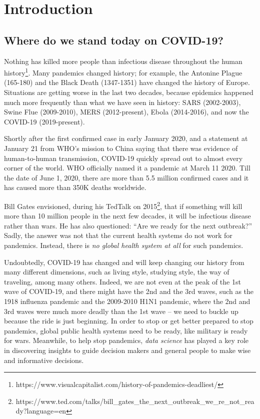 \section{Introduction}
\label{sec:intro}

\subsection{Where do we stand today on COVID-19?}

Nothing has killed more people than infectious disease throughout the human history\footnote{https://www.visualcapitalist.com/history-of-pandemics-deadliest/}. Many pandemics changed history; for example, the Antonine Plague (165-180) and the Black Death (1347-1351) have changed the history of Europe.
%
Situations are getting worse in the last two decades, because epidemics happened much more frequently than what we have seen in history: SARS (2002-2003), Swine Flue (2009-2010), MERS (2012-present), Ebola (2014-2016), and now the COVID-19 (2019-present).


Shortly after the first confirmed case in early January 2020, and a statement at January 21 from WHO's mission to China saying that there was evidence of human-to-human transmission, COVID-19 quickly spread out to almost every corner of the world. WHO officially named it a pandemic at March 11 2020. Till the date of June 1, 2020, there are more than 5.5 million confirmed cases and it has caused more than 350K deaths worldwide.

Bill Gates envisioned, during his TedTalk on 2015\footnote{https://www.ted.com/talks/bill\_gates\_the\_next\_outbreak\_we\_re\_not\_ready?language=en}, that if something will kill more than 10 million people in the next few decades, it will be infectious disease rather than wars.
He has also questioned: ``Are we ready for the next outbreak?'' 
Sadly, the answer was not that the current health systems do not work for pandemics. 
Instead, there is {\em no global health system at all} for such pandemics.


Undoubtedly, COVID-19 has changed and will keep changing our history from many different dimensions, such as living style, studying style, the way of traveling, among many others. Indeed, we are not even at the peak of the 1st wave of COVID-19, and there might have the 2nd and the 3rd waves, such as the 1918 influenza pandemic and the 2009-2010 H1N1 pandemic, where the 2nd and 3rd waves were much more deadly than the 1st wave -- we need to buckle up because the ride is just beginning.
In order to stop or get better prepared to stop pandemics, global public health systems need to be ready, like military is ready for wars. 
%
Meanwhile, to help stop pandemics, {\em data science} has played a key role in discovering insights to guide decision makers and general people to make wise and informative decisions.

